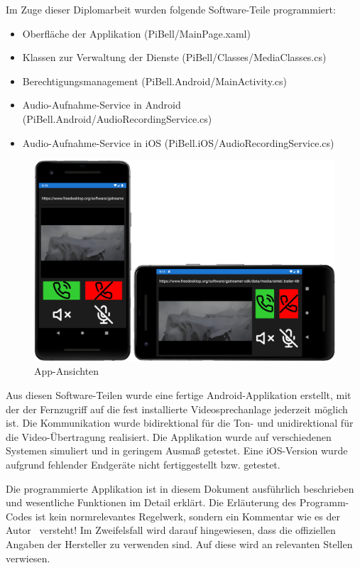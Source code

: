 Im Zuge dieser Diplomarbeit wurden folgende Software-Teile programmiert:
\begin{itemize}
    \item Oberfläche der Applikation (PiBell/MainPage.xaml)
    \item Klassen zur Verwaltung der Dienste (PiBell/Classes/MediaClasses.cs)
    \item Berechtigungsmanagement (PiBell.Android/MainActivity.cs)
    \item Audio-Aufnahme-Service in Android (PiBell.Android/AudioRecordingService.cs)
    \item Audio-Aufnahme-Service in iOS (PiBell.iOS/AudioRecordingService.cs)
\end{itemize}

\begin{figure}[H]
    \centering
    \includegraphics[width=.9\linewidth]{images/projektergebnis/ansichtenFinaleApp.png}
    \caption{App-Ansichten}
\end{figure}

Aus diesen Software-Teilen wurde eine fertige Android-Applikation erstellt, mit der der Fernzugriff auf die fest installierte Videosprechanlage jederzeit möglich ist.
Die Kommunikation wurde bidirektional für die Ton- und unidirektional für die Video-Übertragung realisiert.
Die Applikation wurde auf verschiedenen Systemen simuliert und in geringem Ausmaß getestet.
Eine iOS-Version wurde aufgrund fehlender Endgeräte nicht fertiggestellt bzw. getestet.\par

Die programmierte Applikation ist in diesem Dokument ausführlich beschrieben und wesentliche Funktionen im Detail erklärt.
Die Erläuterung des Programm-Codes ist kein normrelevantes Regelwerk, sondern ein Kommentar wie es der Autor \AndreasGrain\ versteht!
Im Zweifelsfall wird darauf hingewiesen, dass die offiziellen Angaben der Hersteller zu verwenden sind.
Auf diese wird an relevanten Stellen verwiesen.

